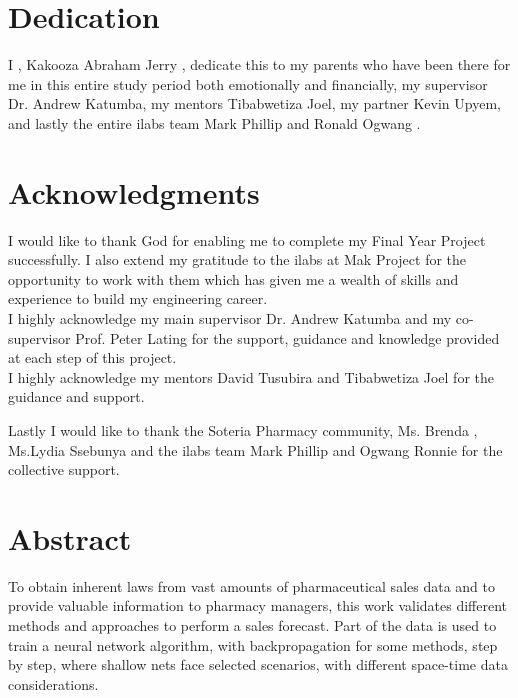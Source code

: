 \documentclass[12pt]{report}
\begin{document}
\newpage


\section*{Dedication}

\vspace{2cm}
\begin{center}
I , Kakooza Abraham Jerry , dedicate this to my parents who have been there for me in this entire study period both emotionally and financially, my supervisor Dr. Andrew Katumba, my mentors Tibabwetiza Joel, my partner Kevin Upyem, and lastly the entire ilabs team Mark Phillip and Ronald Ogwang .
\end{center}



\newpage

\section*{Acknowledgments}
I would like to thank God for enabling me to complete my Final Year Project successfully. I also extend my gratitude to the ilabs at Mak Project for the opportunity to work with them which has given me a wealth of skills and experience to build my engineering career.\\

I highly acknowledge my main supervisor Dr. Andrew Katumba and my co-supervisor Prof. Peter Lating for the support, guidance and knowledge provided at each step of this project.\\
I highly acknowledge my mentors David Tusubira and Tibabwetiza Joel for the guidance and support.

Lastly I would like to thank the Soteria Pharmacy community, Ms. Brenda , Ms.Lydia Ssebunya and the ilabs team Mark Phillip and Ogwang Ronnie for the collective support. 

\newpage



\section*{Abstract}


To obtain inherent laws from vast amounts of pharmaceutical sales data and to provide valuable information to pharmacy managers, this work validates different methods and approaches to perform a sales forecast. Part of the data is used to train a neural network algorithm, with backpropagation for some methods, step by step, where shallow nets face selected scenarios, with different space-time data considerations. 
\end{document}
